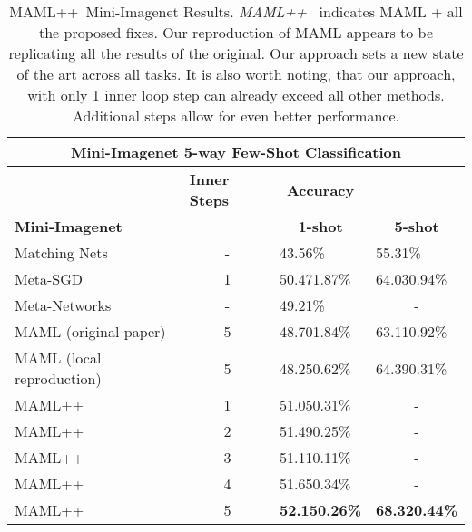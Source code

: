 \documentclass{article} \usepackage[dvipsnames]{xcolor}
\newcommand{\newmaml}{MAML++}
\begin{document}
\begin{table}[tbh]
\centering
\caption{\newmaml\ Mini-Imagenet Results. \emph{\newmaml\ } indicates MAML + all the proposed fixes. Our reproduction of MAML appears to be replicating all the results of the original. Our approach sets a new state of the art across all tasks. It is also worth noting, that our approach, with only 1 inner loop step can already exceed all other methods. Additional steps allow for even better performance.}
\begin{tabular}{|l|l|l|l|}
\hline
\multicolumn{4}{|c|}{\textbf{Mini-Imagenet 5-way Few-Shot Classification}}                                                       \\ \hline
\textbf{\textbf{}}        & \textbf{\textbf{Inner Steps}} & \multicolumn{1}{c|}{\textbf{Accuracy}} &                             \\ \hline
\textbf{Mini-Imagenet}    &                               & \multicolumn{1}{c|}{\textbf{1-shot}}                        & \multicolumn{1}{c|}{\textbf{5-shot}}             \\ \hline
Matching Nets             & \multicolumn{1}{c|}{-}                             & 43.56\%                                & 55.31\%                     \\ \hline
Meta-SGD                  & \multicolumn{1}{c|}{1}                             & 50.471.87\%                     & 64.030.94\%          \\ \hline
Meta-Networks             & \multicolumn{1}{c|}{-}                             & 49.21\%                                & \multicolumn{1}{c|}{-}                         \\ \hline
MAML (original paper)     & \multicolumn{1}{c|}{5}                             & 48.701.84\%                     & 63.110.92\%          \\ \hline
MAML (local reproduction) & \multicolumn{1}{c|}{5}                             & 48.250.62\%                     & 64.390.31\%                     \\ \hline
\newmaml                  & \multicolumn{1}{c|}{1}                             & 51.050.31\%                     & \multicolumn{1}{c|}{-}                           \\ \hline
\newmaml                  & \multicolumn{1}{c|}{2}                             & 51.490.25\%                     & \multicolumn{1}{c|}{-}                           \\ \hline
\newmaml                  & \multicolumn{1}{c|}{3}                             & 51.110.11\%                     & \multicolumn{1}{c|}{-}                           \\ \hline
\newmaml                  & \multicolumn{1}{c|}{4}                             & 51.650.34\%                     & \multicolumn{1}{c|}{-}                           \\ \hline
\newmaml                  & \multicolumn{1}{c|}{5}                             & \textbf{52.150.26\%}            & \textbf{68.320.44\%} \\ \hline
\end{tabular}

	\label{table:mini-imagenet_maml++}
\end{table}
\end{document}
